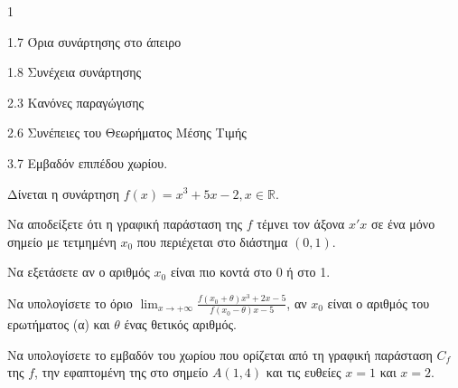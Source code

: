 \begin{ylh}{1}
    \item 1.7 Όρια συνάρτησης στο άπειρο
    \item 1.8 Συνέχεια συνάρτησης
    \item 2.3 Κανόνες παραγώγισης
    \item 2.6 Συνέπειες του Θεωρήματος Μέσης Τιμής
    \item 3.7 Εμβαδόν επιπέδου χωρίου.
\end{ylh}
Δίνεται η συνάρτηση $f(x)=x^3+5x-2, x \in \mathbb{R}$.
\begin{alist}
\item \begin{rlist}
    \item Να αποδείξετε ότι η γραφική παράσταση της $f$ τέμνει τον άξονα $x'x$ σε ένα μόνο σημείο με τετμημένη $x_0$ που περιέχεται στο διάστημα $(0, 1)$. 
    \item Να εξετάσετε αν ο αριθμός $x_0$ είναι πιο κοντά στο 0 ή στο 1. 
\end{rlist}
\item Να υπολογίσετε το όριο $\lim_{x\to+\infty} \frac{f(x_0+\theta)x^3+2x-5}{f(x_0-\theta)x-5}$, αν $x_0$ είναι ο αριθμός του ερωτήματος (α) και $\theta$ ένας θετικός αριθμός. 
\item Να υπολογίσετε το εμβαδόν του χωρίου που ορίζεται από τη γραφική παράσταση $C_f$ της $f$, την εφαπτομένη της στο σημείο $A(1, 4)$ και τις ευθείες $x=1$ και $x=2$. 
\end{alist}